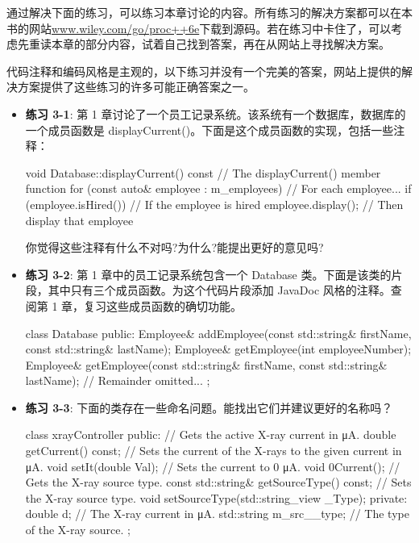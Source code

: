 通过解决下面的练习，可以练习本章讨论的内容。所有练习的解决方案都可以在本书的网站\url{www.wiley.com/go/proc++6e}下载到源码。若在练习中卡住了，可以考虑先重读本章的部分内容，试着自己找到答案，再在从网站上寻找解决方案。

代码注释和编码风格是主观的，以下练习并没有一个完美的答案，网站上提供的解决方案提供了这些练习的许多可能正确答案之一。

\begin{itemize}
\item
\textbf{练习 3-1}: 第 1 章讨论了一个员工记录系统。该系统有一个数据库，数据库的一个成员函数是 displayCurrent()。下面是这个成员函数的实现，包括一些注释：


\begin{cpp}
void Database::displayCurrent() const // The displayCurrent() member function
{
    for (const auto& employee : m_employees) { // For each employee...
        if (employee.isHired()) { // If the employee is hired
            employee.display(); // Then display that employee
        }
    }
}
\end{cpp}

你觉得这些注释有什么不对吗?为什么?能提出更好的意见吗?


\item
\textbf{练习 3-2}: 第 1 章中的员工记录系统包含一个 Database 类。下面是该类的片段，其中只有三个成员函数。为这个代码片段添加 JavaDoc 风格的注释。查阅第 1 章，复习这些成员函数的确切功能。

\begin{cpp}
class Database
{
    public:
    Employee& addEmployee(const std::string& firstName,
    const std::string& lastName);
    Employee& getEmployee(int employeeNumber);
    Employee& getEmployee(const std::string& firstName,
    const std::string& lastName);
    // Remainder omitted...
};
\end{cpp}

\item
\textbf{练习 3-3}: 下面的类存在一些命名问题。能找出它们并建议更好的名称吗？

\begin{cpp}
class xrayController
{
    public:
        // Gets the active X-ray current in μA.
        double getCurrent() const;
        // Sets the current of the X-rays to the given current in μA.
        void setIt(double Val);
        // Sets the current to 0 μA.
        void 0Current();
        // Gets the X-ray source type.
        const std::string& getSourceType() const;
        // Sets the X-ray source type.
        void setSourceType(std::string_view _Type);
    private:
        double d; // The X-ray current in μA.
        std::string m_src__type; // The type of the X-ray source.
};
\end{cpp}


\end{itemize}
